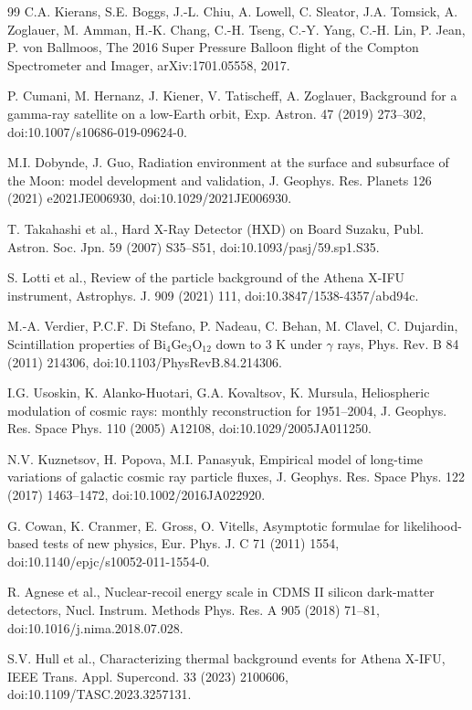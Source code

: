 \documentclass[11pt]{article}
\newcommand{\revblue}[1]{\textcolor{revisionblue}{#1}}
\begin{document}
\begin{thebibliography}{99}
C.A. Kierans, S.E. Boggs, J.-L. Chiu, A. Lowell, C. Sleator, J.A. Tomsick, A. Zoglauer, M. Amman, H.-K. Chang, C.-H. Tseng, C.-Y. Yang, C.-H. Lin, P. Jean, P. von Ballmoos, The 2016 Super Pressure Balloon flight of the Compton Spectrometer and Imager, arXiv:1701.05558, 2017.

P. Cumani, M. Hernanz, J. Kiener, V. Tatischeff, A. Zoglauer,
Background for a gamma-ray satellite on a low-Earth orbit,
Exp. Astron. 47 (2019) 273--302,
doi:10.1007/s10686-019-09624-0.

M.I. Dobynde, J. Guo,
Radiation environment at the surface and subsurface of the Moon:
model development and validation,
J. Geophys. Res. Planets 126 (2021) e2021JE006930,
doi:10.1029/2021JE006930.

\revblue{T. Takahashi et al., Hard X-Ray Detector (HXD) on Board Suzaku,
Publ. Astron. Soc. Jpn. 59 (2007) S35--S51,
doi:10.1093/pasj/59.sp1.S35.}

S. Lotti et al.,
Review of the particle background of the Athena X-IFU instrument,
Astrophys. J. 909 (2021) 111,
doi:10.3847/1538-4357/abd94c.

\revblue{M.-A. Verdier, P.C.F. Di Stefano, P. Nadeau, C. Behan, M. Clavel, C. Dujardin,
Scintillation properties of $\mathrm{Bi_4Ge_3O_{12}}$ down to 3 K under
$\gamma$ rays,
Phys. Rev. B 84 (2011) 214306,
doi:10.1103/PhysRevB.84.214306.}

I.G. Usoskin, K. Alanko-Huotari, G.A. Kovaltsov, K. Mursula,
Heliospheric modulation of cosmic rays: monthly reconstruction for 1951--2004,
J. Geophys. Res. Space Phys. 110 (2005) A12108,
doi:10.1029/2005JA011250.

N.V. Kuznetsov, H. Popova, M.I. Panasyuk,
Empirical model of long-time variations of galactic cosmic ray particle fluxes,
J. Geophys. Res. Space Phys. 122 (2017) 1463--1472,
doi:10.1002/2016JA022920.

G. Cowan, K. Cranmer, E. Gross, O. Vitells, Asymptotic formulae for likelihood-based tests of new physics, Eur. Phys. J. C 71 (2011) 1554, doi:10.1140/epjc/s10052-011-1554-0.

R. Agnese et al., Nuclear-recoil energy scale in CDMS II silicon dark-matter detectors, Nucl. Instrum. Methods Phys. Res. A 905 (2018) 71--81, doi:10.1016/j.nima.2018.07.028.

S.V. Hull et al., Characterizing thermal background events for Athena X-IFU, IEEE Trans. Appl. Supercond. 33 (2023) 2100606, doi:10.1109/TASC.2023.3257131.

\end{thebibliography}
\end{document}
